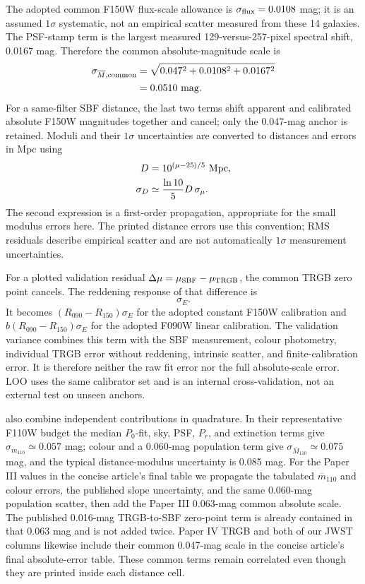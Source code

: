\documentclass[nodoi,nocopyright]{pas}
\newcommand{\mbar}{\overline{m}}
\newcommand{\Mbar}{\overline{M}}
\begin{document}
The adopted common F150W flux-scale allowance is
$\sigma_{\rm flux}=0.0108$ mag; it is an assumed $1\sigma$ systematic,
not an empirical scatter measured from these 14 galaxies. The PSF-stamp term is the
largest measured 129-versus-257-pixel spectral shift, 0.0167 mag. Therefore
the common absolute-magnitude scale is
\begin{equation}
 \begin{split}
 \sigma_{\Mbar,{\rm common}}
 &=\sqrt{0.047^2+0.0108^2+0.0167^2}\\
 &=0.0510~{\rm mag}.
 \end{split}
\end{equation}
For a same-filter SBF distance, the last two terms shift apparent and
calibrated absolute F150W magnitudes together and cancel; only the 0.047-mag
anchor is retained. Moduli and their $1\sigma$ uncertainties are converted
to distances and errors in Mpc using
\begin{align}
 D&=10^{(\mu-25)/5}~{\rm Mpc},\\
 \sigma_D&\simeq\frac{\ln10}{5}D\,\sigma_\mu.
\end{align}
The second expression is a first-order propagation, appropriate for the
small modulus errors here. The printed distance errors use this convention;
RMS residuals describe empirical scatter and are not automatically $1\sigma$
measurement uncertainties.

For a plotted validation residual
$\Delta\mu=\mu_{\rm SBF}-\mu_{\rm TRGB}$, the common TRGB zero point cancels.
The reddening response of that difference is
\begin{equation}
 [R_{090}-R_X+f'_X(C)(R_{090}-R_{150})]\sigma_E.
\end{equation}
It becomes $(R_{090}-R_{150})\sigma_E$ for the adopted constant F150W
calibration and $b(R_{090}-R_{150})\sigma_E$ for the adopted F090W linear
calibration. The validation variance combines this term with the SBF
measurement, colour photometry, individual TRGB error without reddening,
intrinsic scatter, and finite-calibration error. It is therefore neither the
raw fit error nor the full absolute-scale error. LOO uses the same calibrator
set and is an internal cross-validation, not an external test on unseen
anchors.

\citet{Jensen2021} also combine independent contributions in quadrature. In
their representative F110W budget the median $P_0$-fit, sky, PSF, $P_r$, and
extinction terms give $\sigma_{\mbar_{110}}\simeq0.057$ mag; colour and a
0.060-mag population term give $\sigma_{\Mbar_{110}}\simeq0.075$ mag, and the
typical distance-modulus uncertainty is 0.085 mag. For the Paper III values in
the concise article's final table we propagate the tabulated $\mbar_{110}$ and colour errors, the
published slope uncertainty, and the same 0.060-mag population scatter, then
add the Paper III 0.063-mag common absolute scale. The published 0.016-mag
TRGB-to-SBF zero-point term is already contained in that 0.063 mag and is not
added twice. Paper IV TRGB and both of our JWST columns likewise include their
common 0.047-mag scale in the concise article's final absolute-error table. These common terms
remain correlated even though they are printed inside each distance cell.
\end{document}
